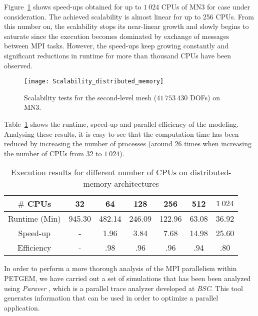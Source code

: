 \documentclass[review]{elsarticle}
\begin{document}
Figure~\ref{fig:Scalability_distributed_memory_MNIII} shows speed-ups obtained for up to $1\:024$ CPUs of MN3 for case under consideration. The achieved scalability is almost linear for up to 256 CPUs. From this number on, the scalability stops its near-linear growth and slowly begins to saturate since the execution becomes dominated by exchange of messages between MPI tasks. However, the speed-ups keep growing constantly and significant reductions in runtime for more than thousand CPUs have been observed.
\begin{figure}[!htbp]
\centering
\texttt{[image: Scalability\_distributed\_memory]}
\caption{Scalability tests for the second-level mesh ($41\:753\:430$ DOFs) on MN3.}
\label{fig:Scalability_distributed_memory_MNIII}
\end{figure}
Table~\ref{table:summary_times_runtime_distributed_memory} shows the runtime, speed-up and parallel efficiency of the modeling. Analysing these results, it is easy to see that the computation time has been reduced by increasing the number of processes (around 26 times when increasing the number of CPUs from 32 to $1\:024$).
\begin{table}[htbp!]
\centering
\caption{Execution results for different number of CPUs on distributed-memory architectures}
\small
\begin{tabular}{ccccccc}
\toprule
$\#$ CPUs & 32 & 64 & 128 & 256 & 512 & $1\:024$\\ 
\midrule
Runtime (Min) & 945.30 & 482.14 & 246.09 & 122.96 & 63.08 & 36.92 \\
Speed-up & - & 1.96 & 3.84 & 7.68 & 14.98 & 25.60 \\
Efficiency & - & .98 & .96 & .96 & .94 & .80 \\
\bottomrule
\end{tabular}
\label{table:summary_times_runtime_distributed_memory}
\end{table}
In order to perform a more thorough analysis of the MPI parallelism within PETGEM, we have carried out a set of simulations that has been been analyzed using \textit{Paraver} \citep{Paraver2017}, which is a parallel trace analyzer developed at \textit{BSC}. This tool generates information that can be used in order to optimize a parallel application.
\end{document}
